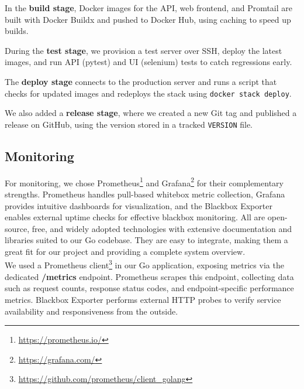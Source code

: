 In the \textbf{build stage}, Docker images for the API, web frontend, and Promtail are built with Docker Buildx and pushed to Docker Hub, using caching to speed up builds.

During the \textbf{test stage}, we provision a test server over SSH, deploy the latest images, and run API (pytest) and UI (selenium) tests to catch regressions early.

The \textbf{deploy stage} connects to the production server and runs a script that checks for updated images and redeploys the stack using \texttt{docker stack deploy}.

We also added a \textbf{release stage}, where we created a new Git tag and published a release on GitHub, using the version stored in a tracked \texttt{VERSION} file.

\subsection{Monitoring} \label{sec:monitoring}
For monitoring, we chose Prometheus\footnote{\url{https://prometheus.io/}} and Grafana\footnote{\url{https://grafana.com/}} for their complementary strengths. Prometheus handles pull-based whitebox metric collection, Grafana provides intuitive dashboards for visualization, and the Blackbox Exporter enables external uptime checks for effective blackbox monitoring. All are open-source, free, and widely adopted technologies with extensive documentation and libraries suited to our Go codebase. They are easy to integrate, making them a great fit for our project and providing a complete system overview.
\\

We used a Prometheus client\footnote{\url{https://github.com/prometheus/client_golang}} in our Go application, exposing metrics via the dedicated \textbf{/metrics} endpoint. Prometheus scrapes this endpoint, collecting data such as request counts, response status codes, and endpoint-specific performance metrics. Blackbox Exporter performs external HTTP probes to verify service availability and responsiveness from the outside.

